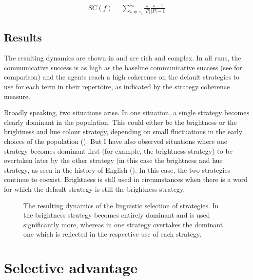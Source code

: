 \begin{align}
SC(f) = \sum_{s = s_i}^{s_n}{\frac{s}{|P|}}{\frac{s-1}{|P|-1}}
\end{align}

\subsection{Results}

The resulting dynamics are shown in  and are
rich and complex. In all runs, the communicative success is as high as
the baseline communicative success (see  for comparison) and the agents reach a
high coherence on the default strategies to use for each term in their
repertoire, as indicated by the strategy coherence measure.

Broadly speaking, two situations arise. In one situation, a single
strategy becomes clearly dominant in the population. This could either
be the brightness or the brightness and hue colour strategy, depending
on small fluctuations in the early choices of the population (). But I have also observed situations where one
strategy becomes dominant first (for example, the brightness
  strategy) to be overtaken later by the other strategy (in this case
the brightness and hue strategy, as seen in the history of
English (). In this case, the two
strategies continue to coexist. Brightness is still used
in circumstances when there is a word for which the default strategy
is still the brightness strategy.

\begin{figure}[htbp]
\begin{center}
\end{center}
\caption[Resulting dynamics of the linguistic selection of
strategies]{The resulting dynamics of the linguistic selection of
  strategies. In  the brightness
    strategy becomes entirely dominant and is used significantly
  more, whereas in  one strategy overtakes
  the dominant one which is reflected in the respective use of each
  strategy.}
\label{f:ls-dynamics}
\end{figure}

\section{Selective advantage}
\label{s:ls-selective-advantage}

